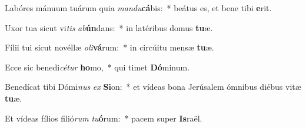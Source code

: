 \item Labóres mánuum tuárum quia \textit{man}\textit{du}\textbf{cá}bis:~* beátus es, et bene tibi \textbf{e}rit.
\item Uxor tua sicut vi\textit{tis} \textit{ab}\textbf{ún}dans:~* in latéribus domus \textbf{tu}æ.
\item Fílii tui sicut novéllæ \textit{o}\textit{li}\textbf{vá}rum:~* in circúitu mensæ \textbf{tu}æ.
\item Ecce sic benedi\textit{cé}\textit{tur} \textbf{ho}mo,~* qui timet \textbf{Dó}minum.
\item Benedícat tibi Dómi\textit{nus} \textit{ex} \textbf{Si}on:~* et vídeas bona Jerúsalem ómnibus diébus vitæ \textbf{tu}æ.
\item Et vídeas fílios filió\textit{rum} \textit{tu}\textbf{ó}rum:~* pacem super \textbf{Is}raël.
